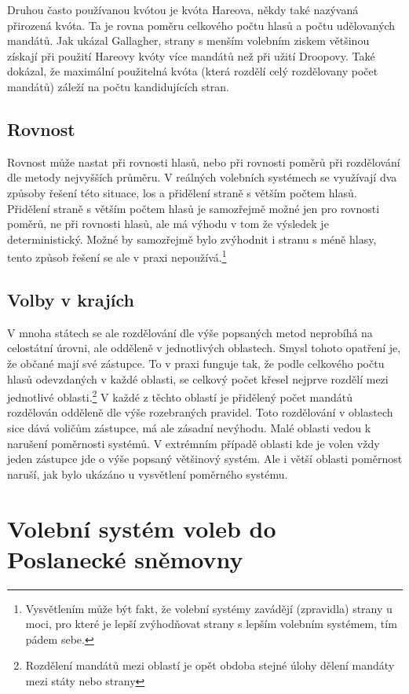 \documentclass[12pt]{report}
\begin{document}
Druhou často používanou kvótou je kvóta Hareova, někdy také nazývaná přirozená kvóta.
Ta je rovna poměru celkového počtu hlasů a počtu udělovaných mandátů.
Jak ukázal Gallagher, strany s menším volebním ziskem většinou získají při použití Hareovy kvóty více mandátů než při užití Droopovy.
Také dokázal, že maximální použitelná kvóta (která rozdělí celý rozdělovany počet mandátů) záleží na počtu kandidujících stran.\autocite{GAL1}
\section{Rovnost} Rovnost může nastat při rovnosti hlasů, nebo při rovnosti poměrů při rozdělování dle metody nejvyšších průměru.
V reálných volebních systémech se využívají dva způsoby řešení této situace, los a přidělení straně s větším počtem hlasů.
Přidělení straně s větším počtem hlasů je samozřejmě možné jen pro rovnosti poměrů, ne při rovnosti hlasů, ale má výhodu v tom že výsledek je deterministický.
Možné by samozřejmě bylo zvýhodnit i stranu s méně hlasy, tento způsob řešení se ale v praxi nepoužívá.\footnote{Vysvětlením může být fakt, že volební systémy zavádějí (zpravidla) strany u moci, pro které je lepší zvýhodňovat strany s lepším volebním systémem, tím pádem sebe.}
\section{Volby v krajích} V mnoha státech se ale rozdělování dle výše popsaných metod neprobíhá na celostátní úrovni, ale odděleně v jednotlivých oblastech.
Smysl tohoto opatření je, že občané mají své  zástupce.
To v praxi funguje tak, že podle celkového počtu hlasů odevzdaných v každé oblasti, se celkový počet křesel nejprve rozdělí mezi jednotlivé oblasti.\footnote{Rozdělení mandátů mezi oblastí je opět obdoba stejné úlohy dělení mandáty mezi státy nebo strany} V každé z těchto oblastí je přidělený počet mandátů rozdělován odděleně dle výše rozebraných pravidel.
Toto rozdělování v oblastech sice dává voličům  zástupce, má ale zásadní nevýhodu.
Malé oblasti vedou k narušení poměrnosti systémů.
V extrémním případě oblasti kde je volen vždy jeden zástupce jde o výše popsaný většinový systém.
Ale i větší oblasti poměrnost naruší, jak bylo ukázáno u vysvětlení poměrného systému.
\chapter{Volební systém voleb do Poslanecké sněmovny} 
\end{document}
